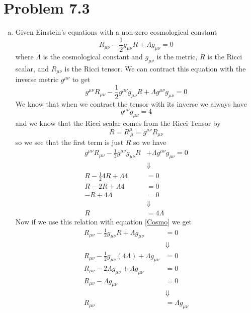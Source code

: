\documentclass[11pt]{article}
\numberwithin{equation}{section}
\newcommand{\HWnum}{7}
\begin{document}
\section{Problem \HWnum.3}
\begin{enumerate}[(a)]
\item
Given Einstein's equations with a non-zero cosmological constant
\begin{equation}
R_{\mu\nu} - \frac{1}{2}g_{\mu\nu}R + \Lambda g_{\mu\nu} = 0
\label{Cosmo}
\end{equation}
where $\Lambda$ is the cosmological constant and $g_{\mu\nu}$ is the metric, $R$ is the Ricci scalar, and $R_{\mu\nu}$ is the Ricci tensor. We can contract this equation with the inverse metric $g^{\mu\nu}$ to get
$$ g^{\mu\nu}R_{\mu\nu} - \frac{1}{2}g^{\mu\nu}g_{\mu\nu}R + \Lambda g^{\mu\nu}g_{\mu\nu} = 0$$
We know that when we contract the tensor with its inverse we always have
$$g^{\mu\nu}g_{\mu\nu} = 4$$
and we know that the Ricci scalar comes from the Ricci Tensor by
$$R = R^{\mu}_{\ \mu} = g^{\mu\nu}R_{\mu\nu}$$
so we see that the first term is just $R$ so we have
\begin{align*}
g^{\mu\nu}R_{\mu\nu} - \frac{1}{2}g^{\mu\nu}g_{\mu\nu}R &+ \Lambda g^{\mu\nu}g_{\mu\nu} = 0\\
&\Downarrow\\
R - \frac{1}{2}4R + \Lambda 4 &= 0\\
R - 2R + \Lambda 4 &= 0\\
-R + 4\Lambda  &= 0\\
&\Downarrow\\
R &= 4\Lambda 
\end{align*}
Now if we use this relation with equation \ref{Cosmo} we get
\begin{align*}
R_{\mu\nu} - \frac{1}{2}g_{\mu\nu}R + \Lambda g_{\mu\nu} &= 0\\
&\Downarrow\\
R_{\mu\nu} - \frac{1}{2}g_{\mu\nu}(4\Lambda) + \Lambda g_{\mu\nu} &= 0\\
R_{\mu\nu} - 2\Lambda g_{\mu\nu} + \Lambda g_{\mu\nu} &= 0\\
R_{\mu\nu} - \Lambda g_{\mu\nu} &= 0\\
&\Downarrow\\
R_{\mu\nu} &= \Lambda g_{\mu\nu} 
\end{align*}


\end{enumerate}
\end{document}
